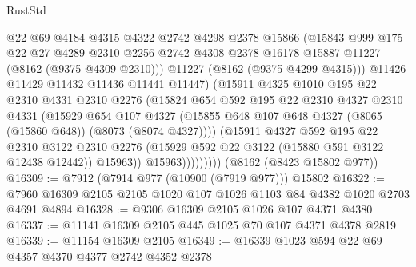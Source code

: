 \begin{lexlean}{RustStd}
\begin{coremodule}
                        @22
                        @69
                        @4184
                        @4315
                        @4322
                        @2742
                        @4298
                        @2378
                        @15866
                        (@15843
                          @999
                          @175
                          @22
                          @27
                          @4289
                          @2310
                          @2256
                          @2742
                          @4308
                          @2378
                          @16178
                          @15887
                          @11227
                          (@8162 (@9375 @4309 @2310)))
                        @11227
                        (@8162 (@9375 @4299 @4315)))
                      @11426
                      @11429
                      @11432
                      @11436
                      @11441
                      @11447)
                    (@15911
                      @4325
                      @1010
                      @195
                      @22
                      @2310
                      @4331
                      @2310
                      @2276
                      (@15824
                        @654
                        @592
                        @195
                        @22
                        @2310
                        @4327
                        @2310
                        @4331
                        (@15929
                          @654
                          @107
                          @4327
                          (@15855 @648 @107 @648 @4327 (@8065 (@15860 @648)) (@8073 (@8074 @4327))))
                        (@15911
                          @4327
                          @592
                          @195
                          @22
                          @2310
                          @3122
                          @2310
                          @2276
                          (@15929 @592 @22 @3122 (@15880 @591 @3122 @12438 @12442))
                          @15963))
                      @15963)))))))))
    (@8162 (@8423 @15802 @977))
@16309 := @7912 (@7914 @977 (@10900 (@7919 @977))) @15802
@16322 := @7960 @16309 @2105 @2105 @1020 @107 @1026 @1103 @84 @4382 @1020 @2703 @4691 @4894
@16328 := @9306 @16309 @2105 @1026 @107 @4371 @4380
@16337 := @11141 @16309 @2105 @445 @1025 @70 @107 @4371 @4378 @2819
@16339 := @11154 @16309 @2105
@16349 := @16339 @1023 @594 @22 @69 @4357 @4370 @4377 @2742 @4352 @2378

\end{coremodule}
\end{lexlean}
